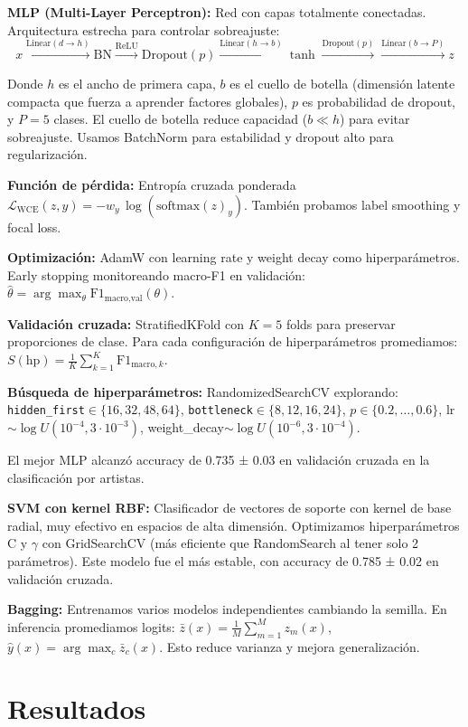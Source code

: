 \documentclass[8pt,a4paper]{article}
\begin{document}
\textbf{MLP (Multi-Layer Perceptron):} Red con capas totalmente conectadas. Arquitectura estrecha para controlar sobreajuste:
\[
x \xrightarrow{\text{Linear}(d\to h)} \text{BN} \xrightarrow{\text{ReLU}} \text{Dropout}(p)
\xrightarrow{\text{Linear}(h\to b)} \tanh \xrightarrow{\text{Dropout}(p)}
\xrightarrow{\text{Linear}(b\to P)} z
\]

Donde $h$ es el ancho de primera capa, $b$ es el cuello de botella (dimensión latente compacta que fuerza a aprender factores globales), $p$ es probabilidad de dropout, y $P=5$ clases. El cuello de botella reduce capacidad ($b\ll h$) para evitar sobreajuste. Usamos BatchNorm para estabilidad y dropout alto para regularización.

\textbf{Función de pérdida:} Entropía cruzada ponderada $\mathcal{L}_{\text{WCE}}(z,y)= - w_{y}\,\log(\text{softmax}(z)_y)$. También probamos label smoothing y focal loss.

\textbf{Optimización:} AdamW con learning rate y weight decay como hiperparámetros. Early stopping monitoreando macro-F1 en validación: $\hat{\theta}=\arg\max_{\theta} \text{F1}_{\text{macro,val}}(\theta)$.

\textbf{Validación cruzada:} StratifiedKFold con $K=5$ folds para preservar proporciones de clase. Para cada configuración de hiperparámetros promediamos: $S(\text{hp})=\frac{1}{K}\sum_{k=1}^K \text{F1}_{\text{macro},k}$.

\textbf{Búsqueda de hiperparámetros:} RandomizedSearchCV explorando: \texttt{hidden\_first}$\in\{16,32,48,64\}$, \texttt{bottleneck}$\in\{8,12,16,24\}$, $p\in\{0.2,\dots,0.6\}$, lr$\sim\log U(10^{-4},3\cdot10^{-3})$, weight\_decay$\sim\log U(10^{-6},3\cdot10^{-4})$.

El mejor MLP alcanzó accuracy de 0.735 ± 0.03 en validación cruzada en la clasificación por artistas.

\textbf{SVM con kernel RBF:} Clasificador de vectores de soporte con kernel de base radial, muy efectivo en espacios de alta dimensión. Optimizamos hiperparámetros C y $\gamma$ con GridSearchCV (más eficiente que RandomSearch al tener solo 2 parámetros). Este modelo fue el más estable, con accuracy de 0.785 ± 0.02 en validación cruzada.

\textbf{Bagging:} Entrenamos varios modelos independientes cambiando la semilla. En inferencia promediamos logits: $\bar{z}(x)=\frac{1}{M}\sum_{m=1}^M z_m(x)$, $\hat{y}(x)=\arg\max_c \bar{z}_c(x)$. Esto reduce varianza y mejora generalización.

\section{Resultados}
\end{document}
